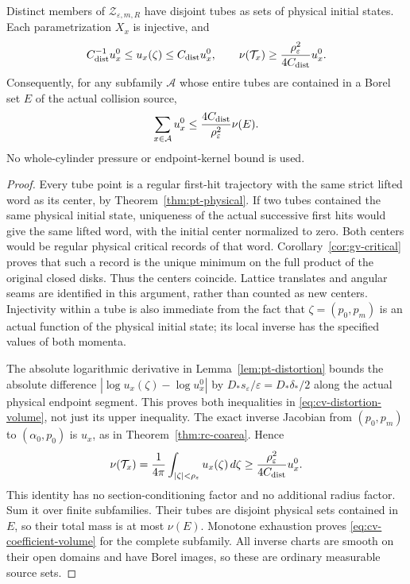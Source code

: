 \begin{lemma}
\label{lem:cv-disjoint-volume}
Distinct members of $\mathscr Z_{\varepsilon,m,R}$ have disjoint
tubes as sets of physical initial states.  Each parametrization
$X_x$ is injective, and
\begin{equation}\label{eq:cv-distortion-volume}
 C_{\rm dist}^{-1}u_x^0\le u_x(\zeta)\le C_{\rm dist}u_x^0,
 \qquad
 \nu(\mathcal T_x)\ge
                   \frac{\rho_\varepsilon^2}{4C_{\rm dist}}u_x^0.
\end{equation}
Consequently, for any subfamily $\mathcal A$ whose entire tubes
are contained in a Borel set $E$ of the actual collision source,
\begin{equation}\label{eq:cv-coefficient-volume}
 \sum_{x\in\mathcal A}u_x^0
       \le\frac{4C_{\rm dist}}{\rho_\varepsilon^2}\nu(E).
\end{equation}
No whole-cylinder pressure or endpoint-kernel bound is used.
\end{lemma}
\begin{proof}
Every tube point is a regular first-hit trajectory with the same
strict lifted word as its center, by Theorem~\ref{thm:pt-physical}.
If two tubes contained the same physical initial state, uniqueness
of the actual successive first hits would give the same lifted word,
with the initial center normalized to zero.  Both centers would be
regular physical critical records of that word.
Corollary~\ref{cor:gv-critical} proves that such a record is the
unique minimum on the full product of the original closed disks.
Thus the centers coincide.  Lattice translates and angular seams
are identified in this argument, rather than counted as new centers.
Injectivity within a tube is also immediate from the fact that
$\zeta=(p_0,p_m)$ is an actual function of the physical initial
state; its local inverse has the specified values of both momenta.

The absolute logarithmic derivative in
Lemma~\ref{lem:pt-distortion} bounds the absolute difference
$|\log u_x(\zeta)-\log u_x^0|$ by
$D_*s_\varepsilon/\varepsilon=D_*\delta_*/2$ along the actual
physical endpoint segment.  This proves both inequalities in
\eqref{eq:cv-distortion-volume}, not just its upper inequality.
The exact inverse Jacobian from $(p_0,p_m)$ to $(\alpha_0,p_0)$
is $u_x$, as in Theorem~\ref{thm:rc-coarea}.  Hence
\[
 \nu(\mathcal T_x)
       =\frac1{4\pi}\int_{|\zeta|<\rho_\varepsilon}
                                  u_x(\zeta)\,d\zeta
       \ge\frac{\rho_\varepsilon^2}{4C_{\rm dist}}u_x^0.
\]
This identity has no section-conditioning factor and no additional
radius factor.  Sum it over finite subfamilies.  Their tubes are
disjoint physical sets contained in $E$, so their total mass is at
most $\nu(E)$.  Monotone exhaustion proves
\eqref{eq:cv-coefficient-volume} for the complete subfamily.
All inverse charts are smooth on their open domains and have Borel
images, so these are ordinary measurable source sets.
\end{proof}

